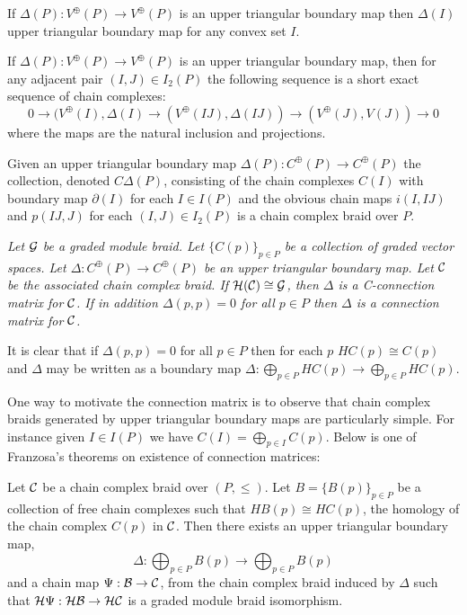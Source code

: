 \begin{prop}
If $\Delta(P):V^\oplus(P)\to V^\oplus(P)$ is an upper triangular boundary map then $\Delta(I)$ upper triangular boundary map for any convex set $I$.   
\end{prop}

\begin{prop}\label{prop:fran:3.3}
If $\Delta(P):V^\oplus(P)\to V^\oplus(P)$ is an upper triangular boundary map, then for any adjacent pair $(I,J)\in I_2(P)$ the following sequence is a short exact sequence of chain complexes: $$0\to (V^\oplus(I),\Delta(I)\to (V^\oplus(IJ),\Delta(IJ))\to (V^\oplus(J),V(J))\to 0$$ where the maps are the natural inclusion and projections.
\end{prop}

\begin{prop}
Given an upper triangular boundary map $\Delta(P):C^\oplus(P)\to C^\oplus(P)$ the collection, denoted $C\Delta(P)$, consisting of the chain complexes $C(I)$ with boundary map $\partial(I)$ for each $I\in I(P)$ and the obvious chain maps $i(I,IJ)$ and $p(IJ,J)$ for each $(I,J)\in I_2(P)$ is a chain complex braid over $P$.
\end{prop}






\begin{defn}
{\em
Let ${\mathcal G}$ be a graded module braid.  Let $\{C(p)\}_{p\in P}$ be a collection of graded vector spaces.  Let $\Delta:C^\oplus(P)\to C^\oplus(P)$ be an upper triangular boundary map.  Let ${\mathcal C}$ be the associated chain complex braid.  If ${\mathcal H}({\mathcal C})\cong {\mathcal G}$, then $\Delta$ is a {\em C-connection matrix} for ${\mathcal C}$.  If in addition $\Delta(p,p)=0$ for all $p\in P$ then $\Delta$ is a {\em connection matrix} for ${\mathcal C}$.
}
\end{defn}

It is clear that if $\Delta(p,p)=0$ for all $p\in P$ then for each $p$ $HC(p)\cong C(p)$ and $\Delta$ may be written as a boundary map $\Delta:\bigoplus_{p\in P} HC(p)\to \bigoplus_{p\in P} HC(p)$.

One way to motivate the connection matrix is to observe that chain complex braids generated by upper triangular boundary maps are particularly simple.  For instance given $I\in I(P)$ we have $C(I) = \bigoplus_{p\in I} C(p)$.  Below is one of Franzosa's theorems on existence of connection matrices:

\begin{thm}
Let ${\mathcal C}$ be a chain complex braid over $(P,\leq)$.  Let $B=\{B(p)\}_{p\in P}$ be a collection of free chain complexes such that $HB(p) \cong HC(p)$, the homology of the chain complex $C(p)$ in ${\mathcal C}$.  Then there exists an upper triangular boundary map, $$\Delta:\bigoplus_{p\in P} B(p)\to \bigoplus_{p\in P}B(p)$$ and a chain map $\Psi:{\mathcal B}\to {\mathcal C}$, from the chain complex braid induced by $\Delta$ such that ${\mathcal H}\Psi:{\mathcal H}{\mathcal B}\to {\mathcal H}{\mathcal C}$ is a graded module braid isomorphism.
\end{thm}

